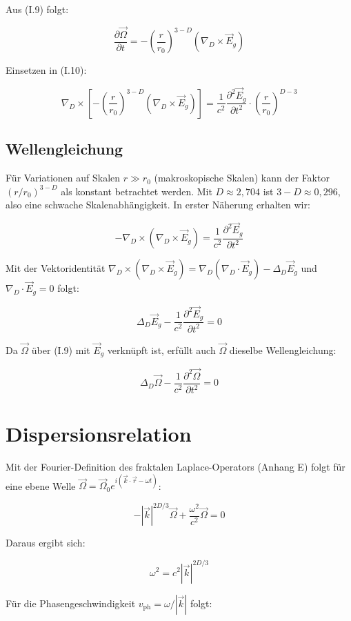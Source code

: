 Aus (I.9) folgt:

\[
\frac{\partial \vec{\Omega}}{\partial t} = -\left(\frac{r}{r_0}\right)^{3-D} (\nabla_D \times \vec{E}_g)
\]

Einsetzen in (I.10):

\[
\nabla_D \times \left[ -\left(\frac{r}{r_0}\right)^{3-D} (\nabla_D \times \vec{E}_g) \right] = \frac{1}{c^2} \frac{\partial^2 \vec{E}_g}{\partial t^2} \cdot \left(\frac{r}{r_0}\right)^{D-3}
\]

\subsection{Wellengleichung}

Für Variationen auf Skalen $r \gg r_0$ (makroskopische Skalen) kann der Faktor 
$(r/r_0)^{3-D}$ als konstant betrachtet werden. Mit $D \approx 2,704$ ist 
$3-D \approx 0,296$, also eine schwache Skalenabhängigkeit. In erster Näherung 
erhalten wir:

\[
-\nabla_D \times (\nabla_D \times \vec{E}_g) = \frac{1}{c^2} \frac{\partial^2 \vec{E}_g}{\partial t^2}
\]

Mit der Vektoridentität $\nabla_D \times (\nabla_D \times \vec{E}_g) = \nabla_D (\nabla_D \cdot \vec{E}_g) - \Delta_D \vec{E}_g$ 
und $\nabla_D \cdot \vec{E}_g = 0$ folgt:

\[
\Delta_D \vec{E}_g - \frac{1}{c^2} \frac{\partial^2 \vec{E}_g}{\partial t^2} = 0 \tag{I.11}
\]

Da $\vec{\Omega}$ über (I.9) mit $\vec{E}_g$ verknüpft ist, erfüllt auch $\vec{\Omega}$ 
dieselbe Wellengleichung:

\[
\Delta_D \vec{\Omega} - \frac{1}{c^2} \frac{\partial^2 \vec{\Omega}}{\partial t^2} = 0 \tag{I.12}
\]

\section{Dispersionsrelation}

Mit der Fourier-Definition des fraktalen Laplace-Operators (Anhang E) folgt für eine 
ebene Welle $\vec{\Omega} = \vec{\Omega}_0 e^{i(\vec{k}\cdot\vec{r} - \omega t)}$:

\[
-|\vec{k}|^{2D/3} \vec{\Omega} + \frac{\omega^2}{c^2} \vec{\Omega} = 0
\]

Daraus ergibt sich:

\[
\omega^2 = c^2 |\vec{k}|^{2D/3} \tag{I.13}
\]

Für die Phasengeschwindigkeit $v_{\text{ph}} = \omega/|\vec{k}|$ folgt:

